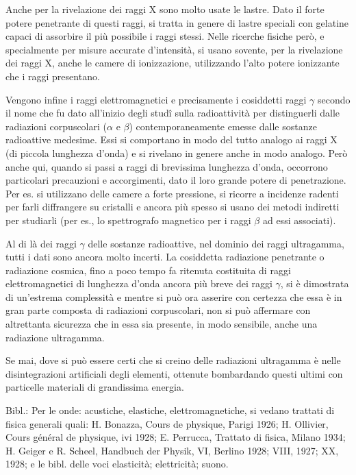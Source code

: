 \documentclass[a4paper]{article}
\begin{document}
Anche per la rivelazione dei raggi X sono molto usate le lastre. Dato il forte potere penetrante di questi raggi, si tratta in genere di lastre speciali con gelatine capaci di assorbire il più possibile i raggi stessi. Nelle ricerche fisiche però, e specialmente per misure accurate d'intensità, si usano sovente, per la rivelazione dei raggi X, anche le camere di ionizzazione, utilizzando l'alto potere ionizzante che i raggi presentano.

Vengono infine i raggi elettromagnetici e precisamente i cosiddetti raggi $\gamma$ secondo il nome che fu dato all'inizio degli studî sulla radioattività per distinguerli dalle radiazioni corpuscolari ($\alpha$ e $\beta$) contemporaneamente emesse dalle sostanze radioattive medesime. Essi si comportano in modo del tutto analogo ai raggi X (di piccola lunghezza d'onda) e si rivelano in genere anche in modo analogo. Però anche qui, quando si passi a raggi di brevissima lunghezza d'onda, occorrono particolari precauzioni e accorgimenti, dato il loro grande potere di penetrazione. Per es. si utilizzano delle camere a forte pressione, si ricorre a incidenze radenti per farli diffrangere su cristalli e ancora più spesso si usano dei metodi indiretti per studiarli (per es., lo spettrografo magnetico per i raggi $\beta$ ad essi associati).

Al di là dei raggi $\gamma$ delle sostanze radioattive, nel dominio dei raggi ultragamma, tutti i dati sono ancora molto incerti. La cosiddetta radiazione penetrante o radiazione cosmica, fino a poco tempo fa ritenuta costituita di raggi elettromagnetici di lunghezza d'onda ancora più breve dei raggi $\gamma$, si è dimostrata di un'estrema complessità e mentre si può ora asserire con certezza che essa è in gran parte composta di radiazioni corpuscolari, non si può affermare con altrettanta sicurezza che in essa sia presente, in modo sensibile, anche una radiazione ultragamma.

Se mai, dove si può essere certi che si creino delle radiazioni ultragamma è nelle disintegrazioni artificiali degli elementi, ottenute bombardando questi ultimi con particelle materiali di grandissima energia.

Bibl.: Per le onde: acustiche, elastiche, elettromagnetiche, si vedano trattati di fisica generali quali: H. Bonazza, Cours de physique, Parigi 1926; H. Ollivier, Cours général de physique, ivi 1928; E. Perrucca, Trattato di fisica, Milano 1934; H. Geiger e R. Scheel, Handbuch der Physik, VI, Berlino 1928; VIII, 1927; XX, 1928; e le bibl. delle voci elasticità; elettricità; suono.
\end{document}
